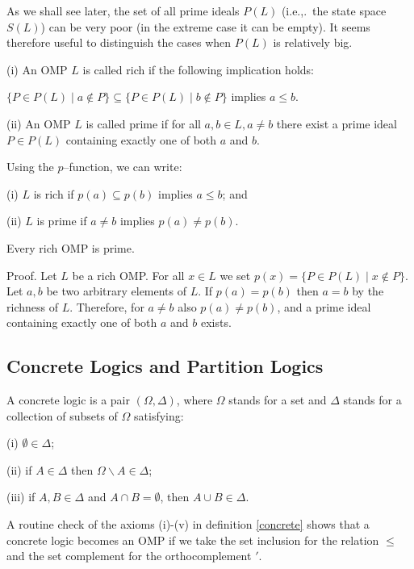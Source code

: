 As we shall see later, the set of all prime ideals $P(L)$
(i.e.,.~the state space $S(L)$) can be very poor
(in the extreme case it can be empty).
It seems therefore useful to distinguish the cases when $P(L)$
is relatively big.

\begin{defin}
\label{richprime}
(i) An OMP $L$ is called rich if the following implication holds:

$\{P \in P(L)\mid a \not\in P\} \subseteq \{P \in P(L)\mid b \not\in P\}$
implies $a \le b$.

(ii) An OMP $L$ is called prime if for all $a,b \in L, a \neq b$
there exist a prime ideal $P \in P(L)$ containing exactly one of both
$a$ and $b$.
\end{defin}

Using the $p$--function, we can write:

(i) $L$ is rich if $p(a) \subseteq p(b)$ implies $a \le b$; and

(ii) $L$ is prime if $a \neq b$ implies $p(a) \neq p(b)$.

\begin{lemma}
\label{richprime2}
Every rich OMP is prime.
\end{lemma}

Proof.
Let $L$ be a rich OMP. For all $x \in L$ we set
$p(x) = \{P \in P(L)\mid x \not\in P\}$.
Let $a,b$ be two arbitrary elements of $L$.
If $p(a) = p(b)$ then $a = b$ by the richness of $L$.
Therefore, for $a\neq b$ also $p(a) \neq p(b)$, and a prime ideal
containing exactly one of both $a$ and $b$ exists.

\subsection{Concrete Logics and Partition Logics}

\begin{defin}
\label{concrete}
A concrete logic is a pair $(\Omega,\Delta)$, where $\Omega$ stands for
a set and $\Delta$ stands for a collection of subsets of $\Omega$
satisfying:

(i) $\emptyset \in \Delta$;

(ii) if $A \in \Delta$ then $\Omega \backslash A \in \Delta$;

(iii) if $A,B \in \Delta $ and $A \cap B = \emptyset$, then
$A \cup B \in \Delta$.
\end{defin}

A routine check of the axioms (i)-(v) in definition \ref{concrete}
shows that a concrete logic
becomes an OMP if we take the set inclusion for the relation $\le $ and
the set complement for the orthocomplement $'$.

